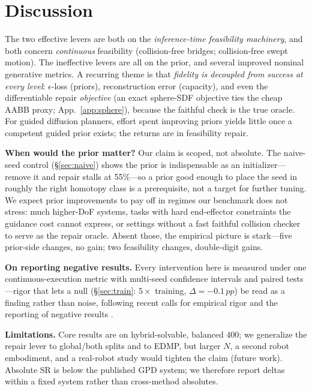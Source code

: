 \documentclass[10pt,twocolumn]{article}
\newcommand{\pp}{\,pp}
\begin{document}
\section{Discussion}
The two effective levers are both on the \emph{inference-time feasibility
machinery}, and both concern \emph{continuous} feasibility (collision-free bridges;
collision-free swept motion). The ineffective levers are all on the prior, and
several improved nominal generative metrics. A recurring theme is that
\emph{fidelity is decoupled from success at every level}: $\epsilon$-loss (priors),
reconstruction error (capacity), and even the differentiable repair \emph{objective}
(an exact sphere-SDF objective ties the cheap AABB proxy; App.~\ref{app:sphere}),
because the faithful check is the true oracle. For guided diffusion planners,
effort spent improving priors yields little once a competent guided prior exists;
the returns are in feasibility repair.

\noindent\textbf{When would the prior matter?} Our claim is scoped, not absolute.
The naive-seed control (\S\ref{sec:naive}) shows the prior is indispensable as an
initializer---remove it and repair stalls at 55\%---so a prior good enough to place
the seed in roughly the right homotopy class is a prerequisite, not a target for
further tuning. We expect prior improvements to pay off in regimes our benchmark
does not stress: much higher-DoF systems, tasks with hard end-effector constraints
the guidance cost cannot express, or settings without a fast faithful collision
checker to serve as the repair oracle. Absent those, the empirical picture is
stark---five prior-side changes, no gain; two feasibility changes, double-digit
gains.

\noindent\textbf{On reporting negative results.} Every intervention here is measured
under one continuous-execution metric with multi-seed confidence intervals and paired
tests---rigor that lets a null (\S\ref{sec:train}: $5\times$ training, $\Delta{=}{-}0.1\pp$)
be read as a finding rather than noise, following recent calls for empirical rigor and
the reporting of negative results \cite{emprobot2024,negresults2024}.

\noindent\textbf{Limitations.} Core results are on hybrid-solvable, balanced 400;
we generalize the repair lever to global/both splits and to EDMP, but larger $N$,
a second robot embodiment, and a real-robot study would tighten the claim (future work).
Absolute SR is below the published GPD system; we therefore report deltas within a fixed
system rather than cross-method absolutes.
\end{document}

